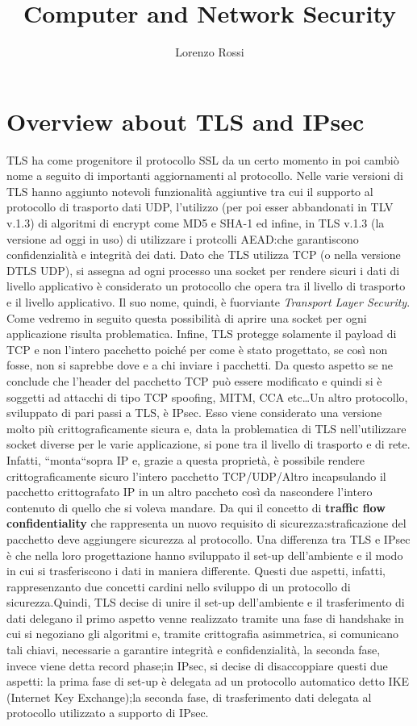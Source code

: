\documentclass[a4paper,draft]{article}
\title{Computer and Network Security}
\author{Lorenzo Rossi}
\begin{document}
\section{Overview about TLS and IPsec}
TLS ha come progenitore il protocollo SSL da un certo momento in poi cambiò nome a seguito di importanti aggiornamenti al protocollo.
Nelle varie versioni di TLS hanno aggiunto notevoli funzionalità aggiuntive tra cui il supporto al protocollo di trasporto dati UDP, l'utilizzo (per poi esser abbandonati in TLV v.1.3) di algoritmi di encrypt come MD5 e SHA-1 ed infine, in TLS v.1.3 (la versione ad oggi in uso) di utilizzare i protcolli AEAD:\@protocolli che garantiscono confidenzialità e integrità dei dati.
Dato che TLS utilizza TCP (o nella versione DTLS UDP), si assegna ad ogni processo una socket per rendere sicuri i dati di livello applicativo è considerato un protocollo che opera tra il livello di trasporto e il livello applicativo.
Il suo nome, quindi, è fuorviante \emph{Transport Layer Security}. Come vedremo in seguito questa possibilità di aprire una socket per ogni applicazione risulta problematica.
Infine, TLS protegge solamente il payload di TCP e non l'intero pacchetto poiché per come è stato progettato, se così non fosse, non si saprebbe dove e a chi inviare i pacchetti. Da questo aspetto se ne conclude che l'header del pacchetto TCP può essere modificato e quindi si è soggetti ad attacchi di tipo TCP spoofing, MITM, CCA etc\dots\newline Un altro protocollo, sviluppato di pari passi a TLS, è IPsec.
Esso viene considerato una versione molto più crittograficamente sicura e, data la problematica di TLS nell'utilizzare socket diverse per le varie applicazione, si pone tra il livello di trasporto e di rete.
Infatti, ``monta``sopra IP e, grazie a questa proprietà, è possibile rendere crittograficamente sicuro l'intero pacchetto TCP/UDP/Altro incapsulando il pacchetto crittografato IP in un altro paccheto così da nascondere l'intero contenuto di quello che si voleva mandare.\newline
Da qui il concetto di \textbf{traffic flow confidentiality} che rappresenta un nuovo requisito di sicurezza:\@la straficazione del pacchetto deve aggiungere sicurezza al protocollo.\newline
Una differenza tra TLS e IPsec è che nella loro progettazione hanno sviluppato il set-up dell'ambiente e il modo in cui si trasferiscono i dati in maniera differente. Questi due aspetti, infatti, rappresenzanto due concetti cardini nello sviluppo di un protocollo di sicurezza.\newline Quindi, TLS decise di unire il set-up dell'ambiente e il trasferimento di dati delegano il primo aspetto venne realizzato tramite una fase di handshake in cui si negoziano gli algoritmi e, tramite crittografia asimmetrica, si comunicano tali chiavi, necessarie a garantire integrità e confidenzialità, la seconda fase, invece viene detta record phase;\@mentre in IPsec, si decise di disaccoppiare questi due aspetti: la prima fase di set-up è delegata ad un protocollo automatico detto IKE (Internet Key Exchange);la seconda fase, di trasferimento dati delegata al protocollo utilizzato a supporto di IPsec.
\end{document}
